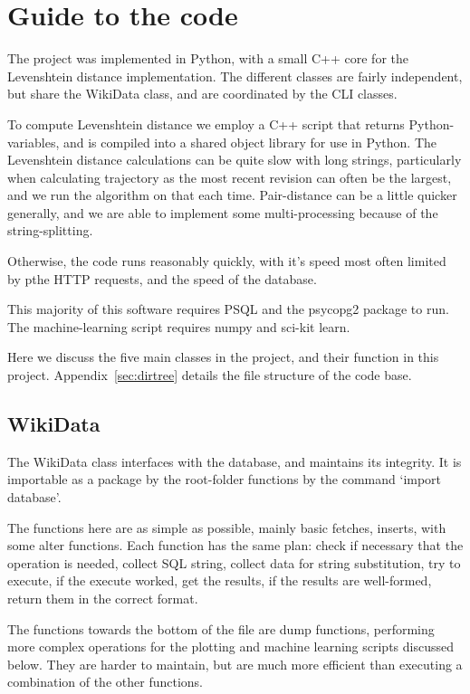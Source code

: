 \section{Guide to the code}

The project was implemented in Python, with a small C++ core for the
Levenshtein distance implementation. The different classes are fairly
independent, but share the WikiData class, and are coordinated by the
CLI classes. 

To compute Levenshtein distance we employ a C++ script that returns
Python-variables, and is compiled into a shared object library for use
in Python. The Levenshtein distance calculations can be quite slow
with long strings, particularly when calculating trajectory as the
most recent revision can often be the largest, and we run the
algorithm on that each time. Pair-distance can be a little quicker
generally, and we are able to implement some multi-processing because
of the string-splitting.

Otherwise, the code runs reasonably quickly, with it's speed most
often limited by pthe HTTP requests, and the speed of the
database.

This majority of this software requires PSQL and the psycopg2 package
to run. The machine-learning script requires numpy and sci-kit learn.

Here we discuss the five main classes in the project, and their
function in this project. Appendix~\ref{sec:dirtree} details the
file structure of the code base.

\subsection*{WikiData}
The WikiData class interfaces with the database, and maintains its
integrity. It is importable as a package by the root-folder functions
by the command `import database'.

The functions here are as simple as possible, mainly basic fetches,
inserts, with some alter functions. Each function has the same plan:
check if necessary that the operation is needed, collect SQL string,
collect data for string substitution, try to execute, if the execute
worked, get the results, if the results are well-formed, return them in the
correct format.

The functions towards the bottom of the file are dump functions,
performing more complex operations for the plotting and machine
learning scripts discussed below. They are harder to maintain, but are
much more efficient than executing a combination of the other
functions.

